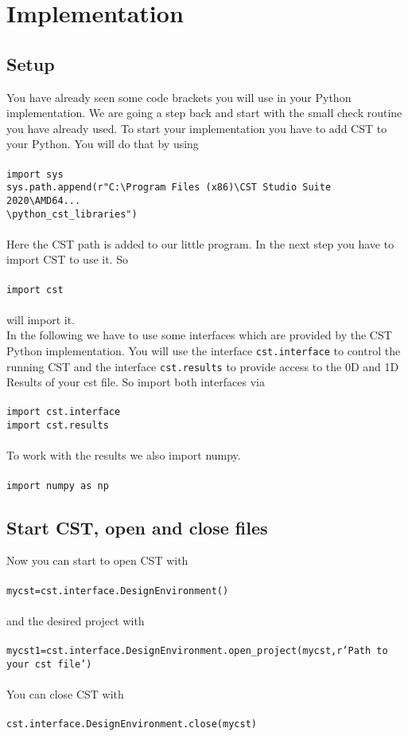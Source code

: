 \documentclass[12pt,accentcolor=tud2b, colorback, openany]{tudreport}
\begin{document}
	\chapter{Implementation}
	\section{Setup}
	You have already seen some code brackets you will use in your Python implementation. We are going a step back and start with the small check routine you have already used. To start your implementation you have to add CST to your Python. You will do that by using\\
	\\
	\texttt{import sys\\
		sys.path.append(r"C:\textbackslash Program Files (x86)\textbackslash CST Studio Suite 2020\textbackslash AMD64...\\
		\textbackslash python\_cst\_libraries")}\\
	\\
	Here the CST path is added to our little program. In the next step you have to import CST to use it. So\\
	\\
	\texttt{import cst}\\
	\\
	will import it.\\
	In the following we have to use some interfaces which are provided by the CST Python implementation. You will use the interface \texttt{cst.interface} to control the running CST and the interface \texttt{cst.results} to provide access to the 0D and 1D Results of your cst file. So import both interfaces via\\
	\\
	\texttt{import cst.interface\\
	import cst.results}\\
	\\
	To work with the results we also import numpy.\\
	\\
	\texttt{import numpy as np}
	\section{Start CST, open and close files}
	Now you can start to open CST with\\
	\\
	\texttt{mycst=cst.interface.DesignEnvironment()}\\
	\\
	and the desired project with\\
	\\
	\texttt{mycst1=cst.interface.DesignEnvironment.open\_project(mycst,r'Path to your cst file')}\\
	\\
	You can close CST with\\
	\\
	\texttt{cst.interface.DesignEnvironment.close(mycst)}
\end{document}
